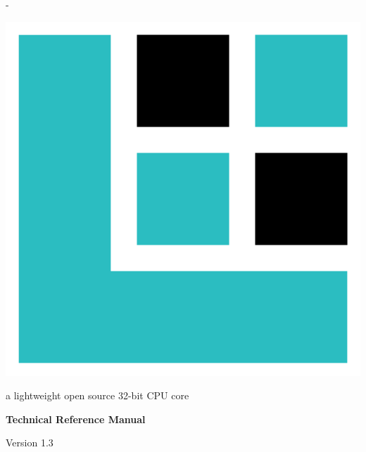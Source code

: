 \frontmatter


\thispagestyle{empty}
\calccentering{\unitlength}
\begin{adjustwidth*}{\unitlength}{-\unitlength}
	\vspace*{\fill}
	\begin{center}
	\DoubleSpacing
	\includegraphics[scale=0.2]{images/lxp32-logo.pdf}\par
	\vspace{\onelineskip}
	\huge \lxp{}\par
	\Large a lightweight open source 32-bit CPU core\par
	\LARGE \textbf{Technical Reference Manual}\par
	\vspace{1.2\onelineskip}
	\large Version 1.3\par
	\vspace*{4\onelineskip}
	\end{center}
	\vspace*{\fill}
\end{adjustwidth*}

\clearpage


\thispagestyle{empty}

